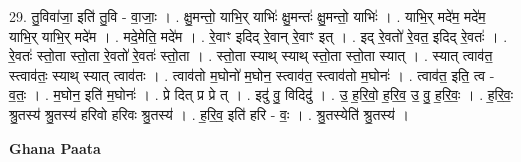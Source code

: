 \documentclass[17pt]{extarticle}
\begin{document}
29. तु॒विवा॑जा॒ इति॑ तु॒वि - वा॒जाः॒ । . क्षु॒मन्तो॒ याभि॒र् याभिः॑ क्षु॒मन्तः॑ क्षु॒मन्तो॒ याभिः॑ । . याभि॒र् मदे॑म॒ मदे॑म॒ याभि॒र् याभि॒र् मदे॑म । . मदे॒मेति॒ मदे॑म । . रे॒वाꣳ इदिद् रे॒वान् रे॒वाꣳ इत् । . इद् रे॒वतो॑ रे॒वत॒ इदिद् रे॒वतः॑ । . रे॒वतः॑ स्तो॒ता स्तो॒ता रे॒वतो॑ रे॒वतः॑ स्तो॒ता । . स्तो॒ता स्याथ् स्याथ् स्तो॒ता स्तो॒ता स्यात् । . स्यात् त्वाव॑त॒ स्त्वाव॑तः॒ स्याथ् स्यात् त्वाव॑तः । . त्वाव॑तो म॒घोनो॑ म॒घोन॒ स्त्वाव॑त॒ स्त्वाव॑तो म॒घोनः॑ । . त्वाव॑त॒ इति॒ त्व - व॒तः॒ । . म॒घोन॒ इति॑ म॒घोनः॑ । . प्रे दित् प्र प्रे त् । . इदु॑ वु॒ विदिदु॑ । . उ॒ ह॒रि॒वो॒ ह॒रि॒व॒ उ॒ वु॒ ह॒रि॒वः॒ । . ह॒रि॒वः॒ श्रु॒तस्य॑ श्रु॒तस्य॑ हरिवो हरिवः श्रु॒तस्य॑ । . ह॒रि॒व॒ इति॑ हरि - वः॒ । . श्रु॒तस्येति॑ श्रु॒तस्य॑ । \newline

\textbf{Ghana Paata } \newline
\end{document}
